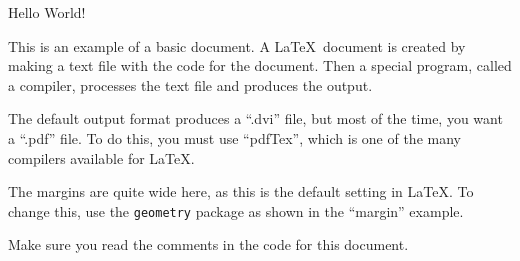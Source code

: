 \documentclass[a4paper,12pt]{article} %
\begin{document}
Hello World!

This is an example of a basic document. A \LaTeX\ document is created by making a text file with the code for the document. Then a special program, called a compiler, processes the text file and produces the output.

The default output format produces a ``.dvi'' file, but most of the time, you want a ``.pdf'' file. To do this, you must use ``pdfTex'', which is one of the many compilers available for \LaTeX.

The margins are quite wide here, as this is the default setting in \LaTeX. To change this, use the \texttt{geometry} package as shown in the ``margin'' example.

Make sure you read the comments in the code for this document.
\end{document}
